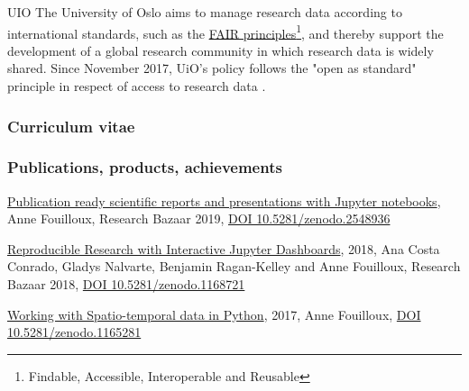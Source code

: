 \begin{sitedescription}{UIO}
 The University of Oslo aims to manage research data according to international standards, such as the \href{https://www.uio.no/for-ansatte/arbeidsstotte/fa/forskningsdata/fair-data/index.html}{FAIR principles}\footnote{Findable, Accessible, Interoperable and Reusable}, and thereby support the development of a global research community in which research data is widely shared.
 Since November 2017, UiO’s policy follows the "open as standard" principle in respect of access to research data \cite{datapolicy-uio}.

\subsubsection*{Curriculum vitae}




%
%
%


\subsubsection*{Publications, products, achievements}

\begin{compactenum}
\item \href{https://annefou.github.io/jupyter_publish/}{Publication ready scientific reports and presentations with Jupyter notebooks}, Anne Fouilloux, Research Bazaar 2019, \href{https://zenodo.org/badge/latestdoi/163517733}{DOI 10.5281/zenodo.2548936}

\item \href{https://annefou.github.io/jupyter_dashboards/}{Reproducible Research with Interactive Jupyter Dashboards}, 2018, Ana Costa Conrado, Gladys Nalvarte, Benjamin Ragan-Kelley and Anne Fouilloux, Research Bazaar 2018, \href{https://zenodo.org/badge/latestdoi/114125668}{DOI 10.5281/zenodo.1168721}

\item \href{https://annefou.github.io/metos_python/}{Working with Spatio-temporal data in Python}, 2017, Anne Fouilloux, \href{https://zenodo.org/badge/latestdoi/96184802}{DOI 10.5281/zenodo.1165281}
\end{compactenum}


\end{sitedescription}
